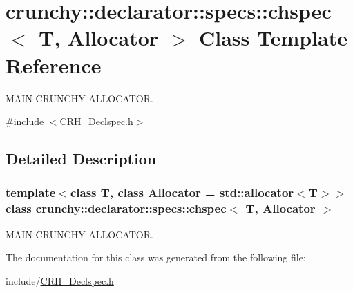 \hypertarget{classcrunchy_1_1declarator_1_1specs_1_1chspec}{}\section{crunchy\+:\+:declarator\+:\+:specs\+:\+:chspec$<$ T, Allocator $>$ Class Template Reference}
\label{classcrunchy_1_1declarator_1_1specs_1_1chspec}


M\+A\+IN C\+R\+U\+N\+C\+HY A\+L\+L\+O\+C\+A\+T\+OR.  




{\ttfamily \#include $<$C\+R\+H\+\_\+\+Declspec.\+h$>$}



\subsection{Detailed Description}
\subsubsection*{template$<$class T, class Allocator = std\+::allocator$<$\+T$>$$>$class crunchy\+::declarator\+::specs\+::chspec$<$ T, Allocator $>$}

M\+A\+IN C\+R\+U\+N\+C\+HY A\+L\+L\+O\+C\+A\+T\+OR. 

The documentation for this class was generated from the following file\+:\begin{DoxyCompactItemize}
\item 
include/\hyperlink{_c_r_h___declspec_8h}{C\+R\+H\+\_\+\+Declspec.\+h}\end{DoxyCompactItemize}
